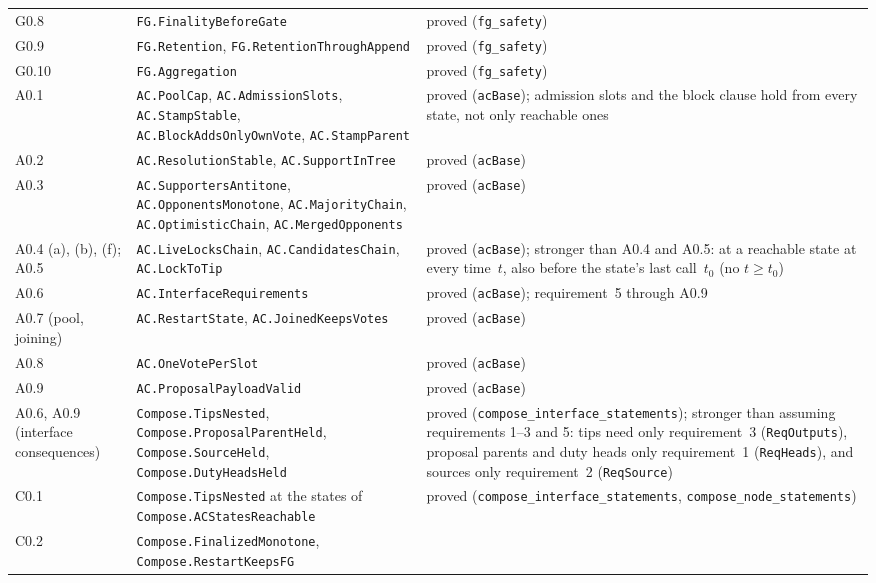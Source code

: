 \documentclass{article}
\begin{document}
{\begin{longtable}{@{}>{\raggedright\arraybackslash}p{1.6cm}>{\raggedright\arraybackslash}p{6.2cm}>{\raggedright\arraybackslash}p{5.2cm}@{}}
G0.8 & \texttt{FG.FinalityBeforeGate} & proved (\texttt{fg\_safety})\\
G0.9 & \texttt{FG.Retention}, \texttt{FG.RetentionThroughAppend} & proved
  (\texttt{fg\_safety})\\
G0.10 & \texttt{FG.Aggregation} & proved (\texttt{fg\_safety})\\
A0.1 & \texttt{AC.PoolCap}, \texttt{AC.AdmissionSlots},
  \texttt{AC.StampStable}, \texttt{AC.BlockAddsOnlyOwnVote},
  \texttt{AC.StampParent} & proved (\texttt{acBase}); admission slots and
  the block clause hold from every state, not only reachable ones\\
A0.2 & \texttt{AC.ResolutionStable}, \texttt{AC.SupportInTree} & proved
  (\texttt{acBase})\\
A0.3 & \texttt{AC.SupportersAntitone}, \texttt{AC.OpponentsMonotone},
  \texttt{AC.MajorityChain}, \texttt{AC.OptimisticChain},
  \texttt{AC.MergedOpponents} & proved (\texttt{acBase})\\
A0.4 (a), (b), (f); A0.5 & \texttt{AC.LiveLocksChain}, \texttt{AC.CandidatesChain},
  \texttt{AC.LockToTip} & proved (\texttt{acBase}); stronger than A0.4 and
  A0.5: at a reachable state at every time~$t$, also before the state's last
  call~$t_0$ (no $t\geq t_0$)\\
A0.6 & \texttt{AC.InterfaceRequirements} & proved (\texttt{acBase});
  requirement~5 through A0.9\\
A0.7 (pool, joining) & \texttt{AC.RestartState}, \texttt{AC.JoinedKeepsVotes}
  & proved (\texttt{acBase})\\
A0.8 & \texttt{AC.OneVotePerSlot} & proved (\texttt{acBase})\\
A0.9 & \texttt{AC.ProposalPayloadValid} & proved (\texttt{acBase})\\
A0.6, A0.9 (interface consequences) & \texttt{Compose.TipsNested},
  \texttt{Compose.ProposalParentHeld}, \texttt{Compose.SourceHeld},
  \texttt{Compose.DutyHeadsHeld} & proved
  (\texttt{compose\_interface\_statements}); stronger than assuming
  requirements 1--3 and 5: tips need only requirement~3 (\texttt{ReqOutputs}),
  proposal parents and duty heads only requirement~1 (\texttt{ReqHeads}),
  and sources only requirement~2 (\texttt{ReqSource})\\
C0.1 & \texttt{Compose.TipsNested} at the states of
  \texttt{Compose.ACStatesReachable} & proved
  (\texttt{compose\_interface\_statements},
  \texttt{compose\_node\_statements})\\
C0.2 & \texttt{Compose.FinalizedMonotone}, \texttt{Compose.RestartKeepsFG} &

\end{longtable}}
\end{document}
